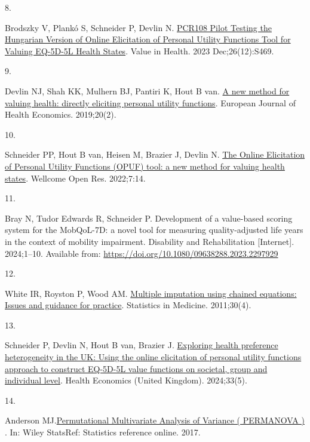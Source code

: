 \documentclass[
  letterpaper,
  DIV=11,
  numbers=noendperiod]{scrartcl}
\newlength{\cslhangindent}
\newlength{\csllabelwidth}
\newenvironment{CSLReferences}[2] %
 {\begin{list}{}{%
  \setlength{\itemindent}{0pt}
  \setlength{\leftmargin}{0pt}
  \setlength{\parsep}{0pt}
  \ifodd #1
   \setlength{\leftmargin}{\cslhangindent}
   \setlength{\itemindent}{-1\cslhangindent}
  \fi
  \setlength{\itemsep}{#2\baselineskip}}}
 {\end{list}}
\newcommand{\CSLLeftMargin}[1]{\parbox[t]{\csllabelwidth}{\strut#1\strut}}
\newcommand{\CSLRightInline}[1]{\parbox[t]{\linewidth - \csllabelwidth}{\strut#1\strut}}
\begin{document}
\begin{CSLReferences}{0}{1}
\CSLLeftMargin{8. }%
\CSLRightInline{Brodszky V, Plankó S, Schneider P, Devlin N.
\href{https://doi.org/10.1016/j.jval.2023.09.2547}{{PCR108 Pilot Testing
the Hungarian Version of Online Elicitation of Personal Utility
Functions Tool for Valuing EQ-5D-5L Health States}}. Value in Health.
2023 Dec;26(12):S469. }

\CSLLeftMargin{9. }%
\CSLRightInline{Devlin NJ, Shah KK, Mulhern BJ, Pantiri K, Hout B van.
\href{https://doi.org/10.1007/s10198-018-0993-z}{{A new method for
valuing health: directly eliciting personal utility functions}}.
European Journal of Health Economics. 2019;20(2). }

\CSLLeftMargin{10. }%
\CSLRightInline{Schneider PP, Hout B van, Heisen M, Brazier J, Devlin N.
\href{https://doi.org/10.12688/wellcomeopenres.17518.1}{{The Online
Elicitation of Personal Utility Functions (OPUF) tool: a new method for
valuing health states}}. Wellcome Open Res. 2022;7:14. }

\CSLLeftMargin{11. }%
\CSLRightInline{Bray N, Tudor Edwards R, Schneider P. {Development of a
value-based scoring system for the MobQoL-7D: a novel tool for measuring
quality-adjusted life years in the context of mobility impairment}.
Disability and Rehabilitation {[}Internet{]}. 2024;1--10. Available
from: \url{https://doi.org/10.1080/09638288.2023.2297929}}

\CSLLeftMargin{12. }%
\CSLRightInline{White IR, Royston P, Wood AM.
\href{https://doi.org/10.1002/sim.4067}{{Multiple imputation using
chained equations: Issues and guidance for practice}}. Statistics in
Medicine. 2011;30(4). }

\CSLLeftMargin{13. }%
\CSLRightInline{Schneider P, Devlin N, Hout B van, Brazier J.
\href{https://doi.org/10.1002/hec.4805}{{Exploring health preference
heterogeneity in the UK: Using the online elicitation of personal
utility functions approach to construct EQ-5D-5L value functions on
societal, group and individual level}}. Health Economics (United
Kingdom). 2024;33(5). }

\CSLLeftMargin{14. }%
\CSLRightInline{Anderson
MJ.\href{https://doi.org/10.1002/9781118445112.stat07841}{{Permutational
Multivariate Analysis of Variance ( PERMANOVA ) }}. In: Wiley StatsRef:
Statistics reference online. 2017. }


\end{CSLReferences}
\end{document}

